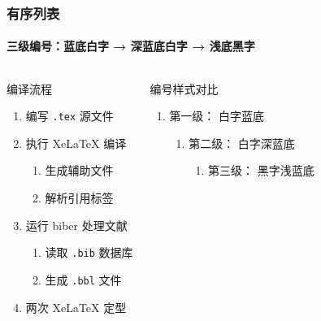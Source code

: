 \begin{frame}
\frametitle{有序列表}
\framesubtitle{三级编号：蓝底白字 → 深蓝底白字 → 浅底黑字}

\begin{columns}[T]
\begin{block}{编译流程}
\begin{enumerate}
  \item 编写 \texttt{.tex} 源文件
  \item 执行 XeLaTeX 编译
  \begin{enumerate}
    \item 生成辅助文件
    \item 解析引用标签
  \end{enumerate}
  \item 运行 biber 处理文献
  \begin{enumerate}
    \item 读取 \texttt{.bib} 数据库
    \item 生成 \texttt{.bbl} 文件
  \end{enumerate}
  \item 两次 XeLaTeX 定型
\end{enumerate}
\end{block}

\begin{exampleblock}{编号样式对比}
\begin{enumerate}
  \item 第一级： 白字蓝底
  \begin{enumerate}
    \item 第二级： 白字深蓝底
    \begin{enumerate}
      \item 第三级： 黑字浅蓝底
    \end{enumerate}
  \end{enumerate}
\end{enumerate}
\end{exampleblock}
\end{columns}
\end{frame}
